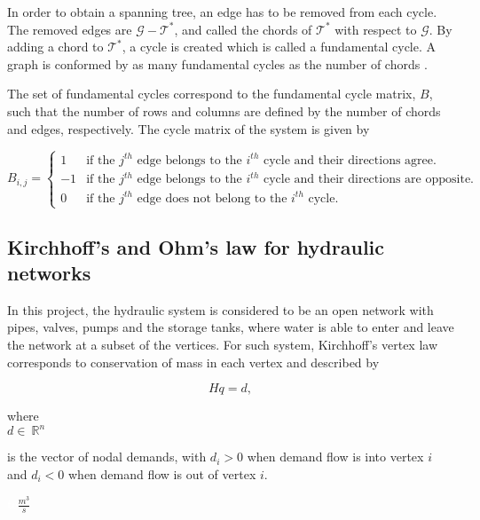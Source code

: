 In order to obtain a spanning tree, an edge has to be removed from each cycle. The removed edges are $\mathcal{G} - \mathcal{T}^*$, and called the chords of $\mathcal{T}^*$ with respect to $\mathcal{G}$. By adding a chord to $\mathcal{T}^*$, a cycle is created which is called a fundamental cycle. A graph is conformed by as many fundamental cycles as the number of chords \cite{deo2017graph}.

The set of fundamental cycles correspond to the fundamental cycle matrix, $B$, such that the number of rows and columns are defined by the number of chords and edges, respectively. The cycle matrix of the system is given by

\begin{equation}
\label{DiGraphCycle}
 B_{i,j} =
		\left\{
		\begin{array}{ll}
		
		1 			&     \text{if the $j^{th}$ edge belongs to the $i^{th}$ cycle and their directions agree.}	
\\
		-1          &     \text{if the $j^{th}$ edge belongs to the $i^{th}$ cycle and their directions are opposite.}
\\
        0           &     \text{if the $j^{th}$ edge does not belong to the $i^{th}$ cycle.}
		\end{array}
		\right.
\end{equation}	

\subsection{Kirchhoff's and Ohm's law for hydraulic networks}
\label{kirchhoffs_law}

In this project, the hydraulic system is considered to be an open network with pipes, valves, pumps and the storage tanks, where water is able to enter and leave the network at a subset of the vertices. For such system, Kirchhoff's vertex law corresponds to conservation of mass in each vertex and described by

\begin{equation}
  \label{vertexlaw_open}
  Hq = d,
\end{equation}

  \begin{minipage}[t]{0.20\textwidth}
where\\
\hspace*{8mm} $d \in \: \mathbb{R}^{n}$ 
\end{minipage}
\begin{minipage}[t]{0.68\textwidth}
\vspace*{2mm}
is the vector of nodal demands, with $d_i > 0$ when demand flow is into vertex $i$ and $d_i < 0$ when demand flow is out of vertex $i$.
\end{minipage}
\begin{minipage}[t]{0.10\textwidth}
\vspace*{2mm}
\textcolor{White}{te}$\unit{\frac{m^3}{s}}$
\end{minipage}

